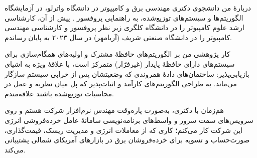 \documentclass[11pt]{article}
\begin{document}

\begin{faSection}{دربارۀ من}
دانشجوی دکتری مهندسی برق و کامپیوتر در دانشگاه واترلو، در آزمایشگاه الگوریتم‌ها و سیستم‌های توزیع‌شده، به راهنمایی پروفسور . پیش از آن، کارشناسی ارشد علوم کامپیوتر را در دانشگاه کلگری زیر نظر پروفسور  و کارشناسی مهندسی کامپیوتر را در دانشگاه صنعتی شریف (آریامهر) در سال ۲۰۲۳ به پایان رساندم.

\vspace{0.4em}
کار پژوهشی من بر الگوریتم‌های حافظۀ مشترک و اولیه‌های همگام‌سازی برای سیستم‌های دارای حافظۀ پایدار (غیرفرّار) متمرکز است، با علاقۀ ویژه به اشیای بازیابی‌پذیر: ساختمان‌های دادۀ همروندی که وضعیتشان پس از خرابی سیستم سازگار می‌ماند. به طراحی الگوریتم‌های کارآمد و اثبات‌پذیر که پل میان نظریه و عمل در محاسبات توزیع‌شده باشند علاقه‌مندم.

\vspace{0.4em}
هم‌زمان با دکتری، به‌صورت پاره‌وقت مهندس نرم‌افزار شرکت  هستم و روی سرویس‌های سمت سرور و واسط‌های برنامه‌نویسی سامانۀ عامل خرده‌فروشی انرژی این شرکت کار می‌کنم؛ کاری که از معاملات انرژی و مدیریت ریسک، قیمت‌گذاری، صورت‌حساب و تسویه برای خرده‌فروشان برق در بازارهای آمریکای شمالی پشتیبانی می‌کند.
\end{faSection}
\end{document}
